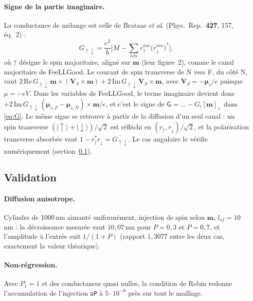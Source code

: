 \documentclass[11pt,a4paper]{article}
\newcommand{\vm}{\bm{m}}
\newcommand{\mG}{\mathsf{G}}
\begin{document}
\paragraph{Signe de la partie imaginaire.} La conductance de mélange est
celle de Brataas \emph{et al.} (Phys.\ Rep.\ \textbf{427}, 157, éq.~2) :
\begin{equation}
  G_{\uparrow\downarrow} = \frac{e^2}{h}\Big[M - \sum_{nm} r_\uparrow^{nm}
  \big(r_\downarrow^{nm}\big)^*\Big],
\end{equation}
où ↑ désigne le spin majoritaire, aligné sur $\vm$ (leur figure~2), comme le
canal majoritaire de FeeLLGood. Le courant de spin transverse de N vers F,
du côté N, vaut
$2\,\mathrm{Re}\,G_{\uparrow\downarrow}\,\vm\times(\bm{V}_S\times\vm)
+ 2\,\mathrm{Im}\,G_{\uparrow\downarrow}\,\bm{V}_S\times\vm$, avec
$\bm{V}_S = -\bm{\mu}_s/e$ puisque $\mu = -eV$. Dans les variables de
FeeLLGood, le terme imaginaire devient donc
$+2\,\mathrm{Im}\,G_{\uparrow\downarrow}\,
(\bm{\mu}_{s,F}-\bm{\mu}_{s,N})\times\vm/e$, et c'est le signe de
$\mG = \ldots - G_i[\vm]_\times$ dans \eqref{eq:G}. Le même signe se
retrouve à partir de la diffusion d'un seul canal : un spin transverse
$(|{\uparrow}\rangle+|{\downarrow}\rangle)/\sqrt2$ est réfléchi en
$(r_\uparrow, r_\downarrow)/\sqrt2$, et la polarisation transverse absorbée
vaut $1 - r_\uparrow^*r_\downarrow = \overline{G_{\uparrow\downarrow}}$. Le
cas angulaire le vérifie numériquement (section~\ref{sec:validation}).

\subsection{Validation}
\label{sec:validation}

\paragraph{Diffusion anisotrope.} Cylindre de 1000\,nm aimanté
uniformément, injection de spin selon $\vm$, $l_{sf}=10$\,nm : la
décroissance mesurée vaut $10{,}07$\,nm pour $P=0{,}3$ et $P=0{,}7$, et
l'amplitude à l'entrée suit $1/(1+P)$ (rapport $1{,}3077$ entre les deux
cas, exactement la valeur théorique).

\paragraph{Non-régression.} Avec $P_1=1$ et des conductances quasi nulles,
la condition de Robin redonne l'accumulation de l'injection \texttt{uP} à
$5\cdot10^{-8}$ près sur tout le maillage.
\end{document}
